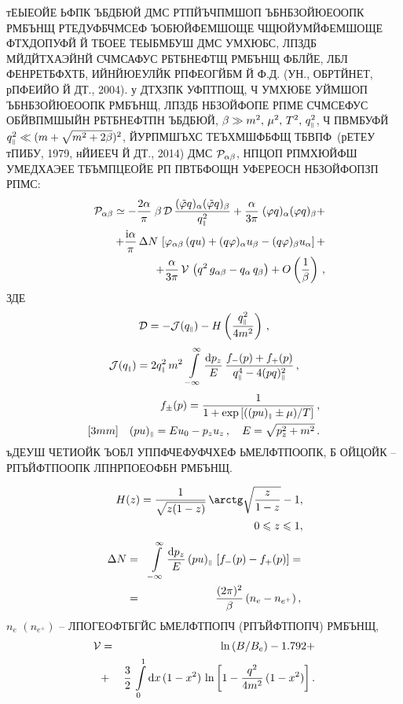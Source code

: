\documentclass[koi8-r]{pazh2col}
\def\mprl{\mbox{\tiny $\|$}}
\def\beq{\begin{eqnarray}}
\def\eeq{\end{eqnarray}}
\def\beq{\begin{eqnarray}}
\def\eeq{\end{eqnarray}}
\newcommand{\ii}{\mathrm{i}}
\newcommand{\dd}{\mathrm{d}}
\begin{document}
тЕЫЕОЙЕ ЬФПК ЪБДБЮЙ ДМС РТПЙЪЧПМШОП ЪБНБЗОЙЮЕООПК РМБЪНЩ РТЕДУФБЧМСЕФ ЪОБЮЙФЕМШОЩЕ ЧЩЮЙУМЙФЕМШОЩЕ 
ФТХДОПУФЙ Й ТБОЕЕ ТЕЫБМБУШ ДМС УМХЮБС, ЛПЗДБ МЙДЙТХАЭЙНЙ СЧМСАФУС РБТБНЕФТЩ РМБЪНЩ ФБЛЙЕ, ЛБЛ 
ФЕНРЕТБФХТБ, ИЙНЙЮЕУЛЙК РПФЕОГЙБМ Й Ф.Д. (УН., ОБРТЙНЕТ, рПФЕИЙО Й ДТ., 2004). 
 у  ДТХЗПК УФПТПОЩ, Ч УМХЮБЕ УЙМШОП ЪБНБЗОЙЮЕООПК РМБЪНЩ, ЛПЗДБ НБЗОЙФОПЕ РПМЕ СЧМСЕФУС 
ОБЙВПМШЫЙН  РБТБНЕФТПН ЪБДБЮЙ,
$\beta \gg m^2,\, \mu^2, \, T^2, \, q^2_{\mprl}$, Ч ПВМБУФЙ $q^2_{\mprl} \ll (m+\sqrt{m^2+2 \beta})^2$, 
ЙУРПМШЪХС 
ТЕЪХМШФБФЩ ТБВПФ~(рЕТЕУ тПИБУ, 1979, нЙИЕЕЧ Й ДТ., 2014)
ДМС ${\cal P}_{\alpha \beta}$, НПЦОП РПМХЮЙФШ УМЕДХАЭЕЕ ТБЪМПЦЕОЙЕ РП 
ПВТБФОЩН УФЕРЕОСН НБЗОЙФОПЗП РПМС:
%
\beq
\nonumber
&&{\cal P}_{\alpha \beta}  
 \simeq 
 - \frac{2\alpha}{\pi} \; \beta \, {\cal D} \, 
\frac{(\tilde \varphi q)_\alpha (\tilde \varphi q)_\beta}{q^2_{\mprl}} 
+ 
\frac{\alpha}{3\pi}\; (\varphi q)_\alpha (\varphi q)_\beta +
\\
\nonumber
&&+\frac{\ii \alpha}{\pi} \, \Delta N \, \left [
\varphi_{\alpha \beta} \, (qu) + (q\varphi)_{\alpha} u_{\beta} - 
(q\varphi)_{\beta} u_{\alpha} \right ]  +
\\
\label{eq:Pab1}
&& + \frac{\alpha}{3\pi} \, {\cal V} \, \left (q^2 \, g_{\alpha \beta} - 
q_{\alpha} \, q_{\beta} \right )  + 
O \left (\frac{1}{\beta} \right) \, , 
\eeq  
\noindent ЗДЕ 
%
\beq
\label{eq:PabD}
{\cal D} = - {\cal J} (q_{\mprl})  - 
H \left (\frac{q^2_{\mprl}}{4m^2} \right)  \, , 
\eeq
%
\beq
\label{eq:PabJ}
{\cal J} (q_{\mprl}) = 2q^2_{\mprl} \, m^2 \, \int\limits_{-\infty}^{\infty}  \frac{\dd p_z}{E} \, 
\frac{f_{-}(p) + f_{+}(p)}{q_{\mprl}^4 - 4(pq)^2_{\mprl}} \, , 
\eeq
%
\beq
\label{eq:fermidist}
&&f_{\pm}(p) = \frac{1}{1+\exp{[((pu)_{\mprl} \pm \mu)/T]}} \, , 
\\ [3mm]
\nonumber
&&(pu)_{\mprl} = E u_0 - p_z u_z \, , \quad E=\sqrt{p_z^2+m^2} \, .
\eeq
\noindent ъДЕУШ ЧЕТИОЙК ЪОБЛ УППФЧЕФУФЧХЕФ ЬМЕЛФТПООПК, Б ОЙЦОЙК -- РПЪЙФТПООПК ЛПНРПОЕОФБН РМБЪНЩ.

%
\beq
\label{eq:H0}
\nonumber
&&H(z)=\frac{1}{\sqrt{z(1 - z)}} \, \arctg \sqrt{\frac{z}{1 - z}} - 1,
\\
\label{eq:H1}
 &&0 \leqslant z \leqslant 1,
\eeq
%
\beq
\nonumber
\Delta N &=& \int\limits_{-\infty}^{\infty}  \frac{\dd p_z}{E} 
\, (pu)_{\mprl} \, \left [f_{-}(p) - f_{+}(p) \right] = 
\\
\label{eq:PabA}
&=& \frac{(2 \pi)^2}{\beta} \, (n_{e} - n_{e^+}) \, , 
\eeq
\noindent $n_{e}$ $(n_{e^+})$ -- ЛПОГЕОФТБГЙС ЬМЕЛФТПОПЧ (РПЪЙФТПОПЧ) РМБЪНЩ, 
%
\beq
\label{eq:Lambda}
{\cal V} &=& \ln{(B/B_e)} - 1.792 + 
\\
\nonumber
&+&
\frac{3}{2} \, \int\limits_0^1 \dd x \, (1-x^2) \, 
\ln{\left [1- \frac{q^2}{4m^2} \, (1-x^2) \right ]} \, .
\eeq
\end{document}
